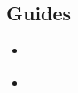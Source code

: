 \documentclass[letterpaper, 11pt]{article}
\title{\deliv{\imp}{Part 1: Report}}
\date{\dateimpone}
\begin{document}
\maketitle
\tableofcontents
\thispagestyle{fancy}

\begin{flushleft}





\section{Guides}
\begin{itemize}
\item \cite{gmp}
\item \cite{make}
\end{itemize}




\end{flushleft}
\end{document}
